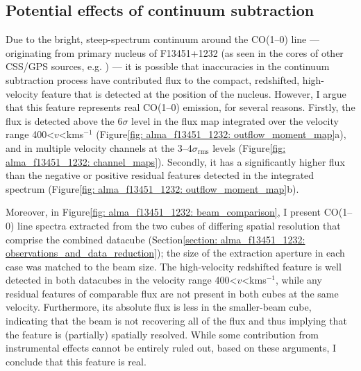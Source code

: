\subsection{Potential effects of continuum subtraction}
\label{section: alma_f13451_1232: analysis_and_results: potential_effects_of_continuum_subtraction}

Due to the bright, steep-spectrum continuum around the CO(1--0) line --- originating from primary nucleus of F13451+1232 (as seen in the cores of other CSS/GPS sources, e.g. \citealt{Oosterloo2019}) --- it is possible that inaccuracies in the continuum subtraction process have contributed flux to the compact, redshifted, high-velocity feature that is detected at the position of the nucleus. However, I argue that this feature represents real CO(1--0) emission, for several reasons. Firstly, the flux is detected above the $6\sigma$ level in the flux map integrated over the velocity range 400\;\textless\;$v$\;\textless{}\;km\;s$^{-1}$ (Figure\;\ref{fig: alma_f13451_1232: outflow_moment_map}a), and in multiple velocity channels at the 3--4$\sigma_\mathrm{rms}$ levels (Figure\;\ref{fig: alma_f13451_1232: channel_maps}). Secondly, it has a significantly higher flux than the negative or positive residual features detected in the integrated spectrum (Figure\;\ref{fig: alma_f13451_1232: outflow_moment_map}b). 

Moreover, in Figure\;\ref{fig: alma_f13451_1232: beam_comparison}, I present CO(1--0) line spectra extracted from the two cubes of differing spatial resolution that comprise the combined datacube (Section\;\ref{section: alma_f13451_1232: observations_and_data_reduction}); the size of the extraction aperture in each case was matched to the beam size. The high-velocity redshifted feature is well detected in both datacubes in the velocity range 400\;\textless\;$v$\;\textless{}\;km\;s$^{-1}$, while any residual features of comparable flux are not present in both cubes at the same velocity. Furthermore, its absolute flux is less in the smaller-beam cube, indicating that the beam is not recovering all of the flux and thus implying that the feature is (partially) spatially resolved. While some contribution from instrumental effects cannot be entirely ruled out, based on these arguments, I conclude that this feature is real.


